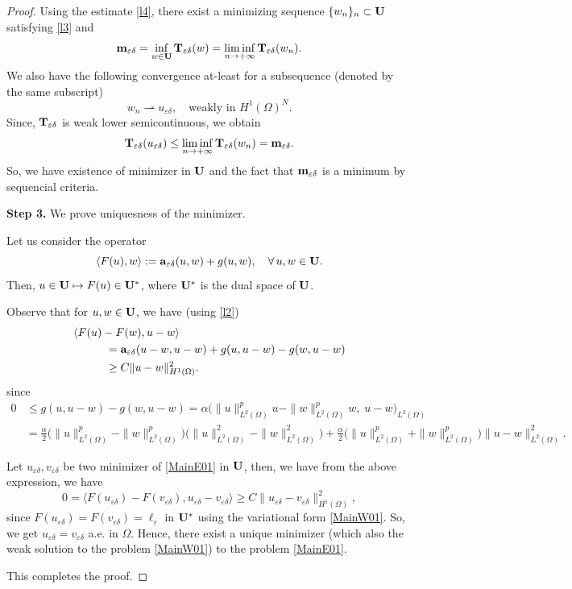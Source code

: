 \documentclass[11pt,a4paper]{article}
\numberwithin{equation}{section}
\def\O{\Omega}
\def\d{\delta}
\def\e{\varepsilon}
\def\Ga{{\bf a}}
\def\ed{{\varepsilon\delta}}
\def\Ga{{\bf a}}
\def\Gm{{\bf m}}
\def\GT{{\bf T}}
\def\GU{{\bf U}}
\begin{document}
\begin{proof}
	Using the estimate \eqref{l4}, there exist a minimizing sequence $\{w_n\}_n\subset \GU$ satisfying \eqref{l3} and
	$$\Gm_\ed=\inf_{w\in\GU}\GT_\ed(w)=\liminf_{n\to+\infty}\GT_\ed(w_n).$$
	We also have the following convergence at-least for a subsequence (denoted by the same subscript)
	$$w_n\rightharpoonup u_\ed,\quad\text{weakly in $H^1(\O)^N$}.$$
	Since, $\GT_\ed$ is weak lower semicontinuous, we obtain
	$$\GT_\ed(u_\ed)\leq \liminf_{n\to+\infty}\GT_\ed(w_n)=\Gm_\ed.$$
	So, we have existence of  minimizer in $\GU$ and the fact that $\Gm_\ed$ is a minimum by sequencial criteria.
	
	{\bf Step 3.} We prove uniquesness of the minimizer.
	
	Let us consider the operator 
	$$\langle F(u),w\rangle:=\Ga_\ed(u,w)+g(u,w),\quad\forall\,u,w\in\GU.$$
	Then, $u\in\GU\mapsto F(u)\in\GU^\ast$, where $\GU^\ast$ is the dual space of $\GU$.
	
	Observe that for $u,w\in\GU$, we have (using \eqref{l2})
	\begin{align*}
		&\langle F(u)-F(w),u-w\rangle\\
		&\hskip1cm=\Ga_\ed(u-w,u-w)+g(u,u-w)-g(w,u-w)\\
		&\hskip 1cm \geq C\|u-w\|^2_{H^1(\O)}.
	\end{align*}
	since
	\begin{align*}
		0 &\le g(u,u-w)-g(w,u-w)
		= \alpha\big(\|u\|_{L^2(\Omega)}^{p}u-\|w\|_{L^2(\Omega)}^{p}w,\;u-w\big)_{L^2(\Omega)}\\
		&=\frac{\alpha}{2}\Big(\|u\|_{L^2(\Omega)}^{p}-\|w\|_{L^2(\Omega)}^{p}\Big)
		\Big(\|u\|_{L^2(\Omega)}^{2}-\|w\|_{L^2(\Omega)}^{2}\Big)
		+\frac{\alpha}{2}\Big(\|u\|_{L^2(\Omega)}^{p}+\|w\|_{L^2(\Omega)}^{p}\Big)
		\|u-w\|_{L^2(\Omega)}^{2}.
	\end{align*}
	
	Let $u_\ed,v_\ed$ be two minimizer of \eqref{MainE01} in $\GU$, then, we have from the above expression, we have
	\begin{equation*}
		0=\langle F(u_\ed)-F(v_\ed),u_\ed-v_\ed\rangle\geq C\|u_\ed-v_\ed\|^2_{H^1(\O)},
	\end{equation*}
	since $F(u_\ed)=F(v_\ed)=\ell_\e$ in $\GU^\ast$ using the variational form \eqref{MainW01}. So, we get $u_\ed=v_\ed$ a.e. in $\O$. Hence, there exist a unique minimizer (which also the weak solution to the problem \eqref{MainW01}) to the problem \eqref{MainE01}.
	
	This completes the proof.
\end{proof}	
\end{document}

